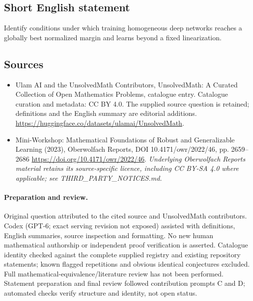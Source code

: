 \documentclass[11pt]{article}
\begin{document}
\subsection{Short English statement}
Identify conditions under which training homogeneous deep networks reaches a globally best normalized margin and learns beyond a fixed linearization.
\subsection{Sources}
\begin{itemize}
\item[\hypertarget{source:statement:1}{S1}] Ulam AI and the UnsolvedMath Contributors, UnsolvedMath: A Curated Collection of Open Mathematics Problems, catalogue entry. Catalogue curation and metadata: CC BY 4.0. The supplied source question is retained; definitions and the English summary are editorial additions.
\url{https://huggingface.co/datasets/ulamai/UnsolvedMath}.
\item[\hypertarget{source:statement:2}{S2}] Mini-Workshop: Mathematical Foundations of Robust and Generalizable Learning (2023), Oberwolfach Reports, DOI 10.4171/owr/2022/46, pp. 2659--2686
\url{https://doi.org/10.4171/owr/2022/46}.
\textit{Underlying Oberwolfach Reports material retains its source-specific licence, including CC BY-SA 4.0 where applicable; see THIRD\_PARTY\_NOTICES.md.}
\end{itemize}
\paragraph{Preparation and review.}
Original question attributed to the cited source and UnsolvedMath contributors. Codex (GPT-6; exact serving revision not exposed) assisted with definitions, English summaries, source inspection and formatting. No new human mathematical authorship or independent proof verification is asserted. Catalogue identity checked against the complete supplied registry and existing repository statements; known flagged repetitions and obvious identical conjectures excluded. Full mathematical-equivalence/literature review has not been performed. Statement preparation and final review followed contribution prompts C and D; automated checks verify structure and identity, not open status.
\label{end:statement}
\end{document}
